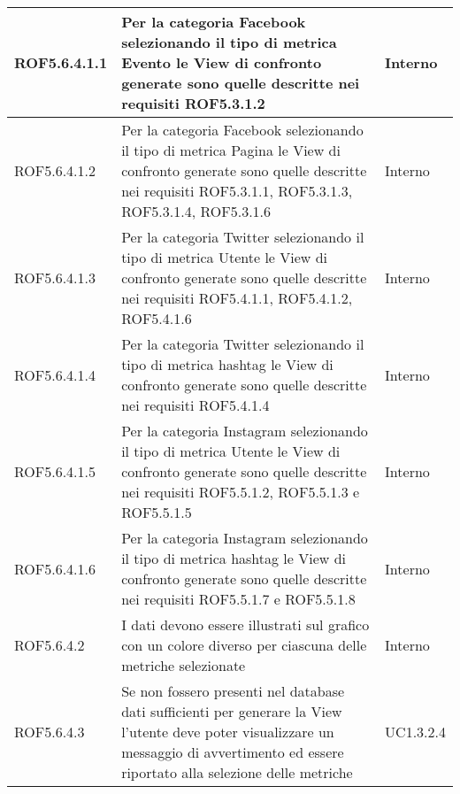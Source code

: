 \begin{center}
\begin{longtable}{| p{2.5cm} | p{8cm} | p{2cm} |}
		\hline
		ROF5.6.4.1.1  &  Per la categoria Facebook selezionando il tipo di metrica Evento le View di confronto generate sono quelle descritte nei requisiti ROF5.3.1.2  &  Interno \\
		\hline
		ROF5.6.4.1.2  &  Per la categoria Facebook selezionando il tipo di metrica Pagina le View di confronto generate sono quelle descritte nei requisiti ROF5.3.1.1, ROF5.3.1.3, ROF5.3.1.4, ROF5.3.1.6 &  Interno \\
		\hline
		ROF5.6.4.1.3  &  Per la categoria Twitter selezionando il tipo di metrica Utente le View di confronto generate sono quelle descritte nei requisiti ROF5.4.1.1, ROF5.4.1.2, ROF5.4.1.6 &  Interno \\
		\hline
		ROF5.6.4.1.4  &  Per la categoria Twitter selezionando il tipo di metrica hashtag le View di confronto generate sono quelle descritte nei requisiti ROF5.4.1.4 &  Interno \\
		\hline
		ROF5.6.4.1.5  &  Per la categoria Instagram selezionando il tipo di metrica Utente le View di confronto generate sono quelle descritte nei requisiti ROF5.5.1.2, ROF5.5.1.3 e ROF5.5.1.5 &  Interno \\
		\hline
		ROF5.6.4.1.6  &  Per la categoria Instagram selezionando il tipo di metrica hashtag le View di confronto generate sono quelle descritte nei requisiti ROF5.5.1.7 e ROF5.5.1.8  &  Interno \\
		\hline
		ROF5.6.4.2  &  I dati devono essere illustrati sul grafico con un colore diverso per ciascuna delle metriche selezionate  &  Interno \\
		\hline
		ROF5.6.4.3  &  Se non fossero presenti nel database dati sufficienti per generare la View l'utente deve poter visualizzare un messaggio di avvertimento ed essere riportato alla selezione delle metriche  &  UC1.3.2.4 \\
		\hline





\end{longtable}
\end{center}
